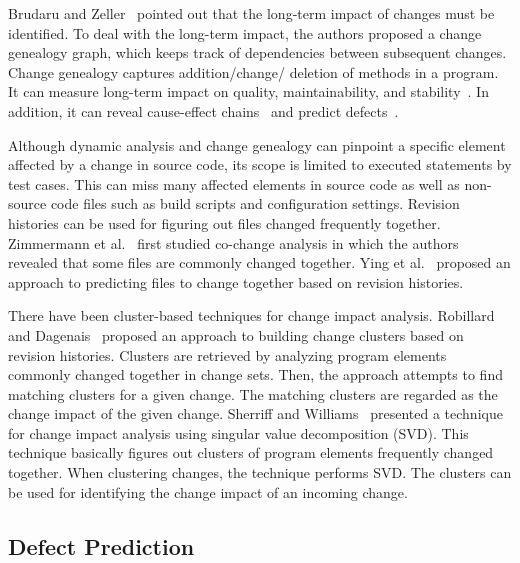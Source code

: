 Brudaru and Zeller~\cite{brudaru_what_2008} pointed out that the long-term
impact of changes must be identified. To deal with the long-term impact, the authors proposed
a change genealogy graph, which keeps track of dependencies between
subsequent changes. Change genealogy captures addition/change/ deletion of
methods in a program. It can measure long-term impact on quality,
maintainability, and stability~\cite{herzig_capturing_2010}. 
In addition, it can reveal cause-effect chains~\cite{herzig_mining_2011} and predict
defects~\cite{herzig_predicting_2013}.


Although dynamic analysis and change genealogy can pinpoint a specific element
affected by a change in source code, its scope is limited to executed statements
by test cases. This can miss many affected elements in source code as well as
non-source code files such as build scripts and configuration settings.
Revision histories can be used for figuring out files changed frequently
together. Zimmermann et al.~\cite{zimmermann_mining_2004} first studied
co-change analysis in which the authors revealed that some files are
commonly changed together. Ying et al.~\cite{ying_predicting_2004} proposed an
approach to predicting files to change together based on revision histories.


There have been cluster-based techniques for change impact analysis. Robillard
and Dagenais~\cite{robillard_retrieving_2008} proposed an approach to building
change clusters based on revision histories. Clusters are retrieved by analyzing
program elements commonly changed together in change sets. Then, the approach
attempts to find matching clusters for a given change. The matching clusters are
regarded as the change impact of the given change. Sherriff and
Williams~\cite{sherriff_empirical_2008} presented a technique for change impact
analysis using singular value decomposition (SVD). This technique basically
figures out clusters of program elements frequently changed together. When clustering
changes, the technique performs SVD. The clusters can be used for identifying
the change impact of an incoming change. 
 



\subsection{Defect Prediction}

